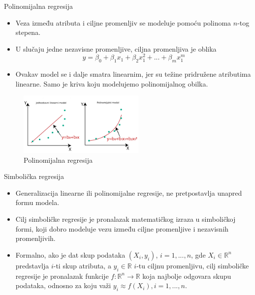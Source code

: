 \documentclass{beamer}
\begin{document}
\begin{frame}{Polinomijalna regresija}
\begin{itemize}
    \item Veza izmed̄u atributa i ciljne promenljiv se modeluje pomoću polinoma $n$-tog stepena.
    \item U slučaju jedne nezavisne promenljive, ciljna promenljiva je oblika
    \[ y = \beta_0 + \beta_1 x_1 + \beta_2 x_1^{2} + ... + \beta_m x_1^{m} \] 
    \item Ovakav model se i dalje smatra linearnim, jer su težine pridružene atributima linearne. Samo je kriva koju modelujemo polinomijalnog obilka.
\end{itemize}

\begin{figure}[!ht]
\begin{center}
\includegraphics[width=0.55\textwidth]{images/polynomial_regression.jpg}
\end{center}
\caption{Polinomijalna regresija}
\label{fig:polyReg}
\end{figure}

\end{frame}

\begin{frame}{Simbolička regresija}
\begin{itemize}
    \item Generalizacija linearne ili polinomijalne regresije, ne pretpostavlja unapred formu modela.
    \item Cilj simboličke regresije je pronalazak matematičkog izraza u simboličkoj formi, koji dobro modeluje vezu izmed̄u ciljne promenljive i nezavisnih promenljivih.
    \item Formalno, ako je dat skup podataka $(X_i, y_i)$, $i=1,...,n$, gde $X_i \in \mathbb{R}^{n}$ predstavlja $i$-ti skup atributa, a $y_i \in \mathbb{R}$ $i$-tu ciljnu promenljivu, cilj simboličke regresije je pronalazak funkcije $f: \mathbb{R}^{n} \rightarrow \mathbb{R}$ koja najbolje odgovara skupu podataka, odnosno za koju važi $y_i \approx f(X_i), i=1,...,n$.
\end{itemize}
\end{frame}
\end{document}
